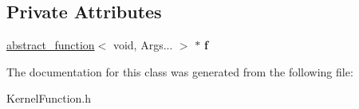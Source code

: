 \subsection*{Private Attributes}
\begin{DoxyCompactItemize}
\item 
\mbox{\label{classbicycle_1_1function_3_01void_07_args_8_8_8_08_4_a0f880231a4e0d21d1cb8290b887dd4bb}} 
\hyperlink{structbicycle_1_1abstract__function}{abstract\+\_\+function}$<$ void, Args... $>$ $\ast$ {\bfseries f}
\end{DoxyCompactItemize}


The documentation for this class was generated from the following file\+:\begin{DoxyCompactItemize}
\item 
Kernel\+Function.\+h\end{DoxyCompactItemize}
